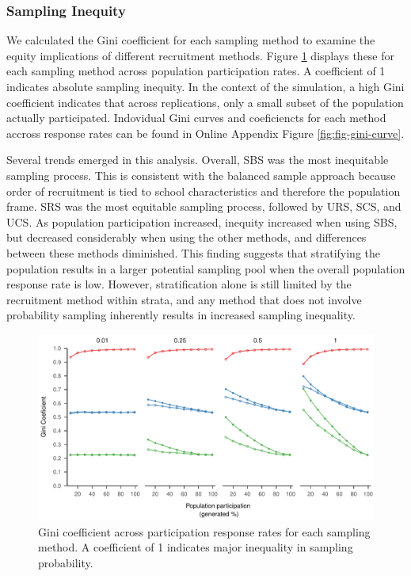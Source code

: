 \documentclass[
  english,
  man,floatsintext]{apa6}
\begin{document}
\hypertarget{sampling-inequity-1}{%
\subsubsection{Sampling Inequity}\label{sampling-inequity-1}}

We calculated the Gini coefficient for each sampling method to examine the equity implications of different recruitment methods. Figure \ref{fig:fig-gini} displays these for each sampling method across population participation rates. A coefficient of 1 indicates absolute sampling inequity. In the context of the simulation, a high Gini coefficient indicates that across replications, only a small subset of the population actually participated.   
Indovidual Gini curves and coeficiencts for each method accross response rates can be found in Online Appendix Figure \ref{fig:fig-gini-curve}.

Several trends emerged in this analysis. Overall, SBS was the most inequitable sampling process. This is consistent with the balanced sample approach because order of recruitment is tied to school characteristics and therefore the population frame. SRS was the most equitable sampling process, followed by URS, SCS, and UCS.
As population participation increased, inequity increased when using SBS, but decreased considerably when using the other methods, and differences between these methods diminished. This finding suggests that stratifying the population results in a larger potential sampling pool when the overall population response rate is low.
However, stratification alone is still limited by the recruitment method within strata, and any method that does not involve probability sampling inherently results in increased sampling inequality.



\begin{figure}
\centering
\includegraphics{6---Paper_files/figure-latex/fig-gini-1.pdf}
\caption{\label{fig:fig-gini}Gini coefficient across participation response rates for each sampling method. A coefficient of 1 indicates major inequality in sampling probability.}
\end{figure}
\end{document}
